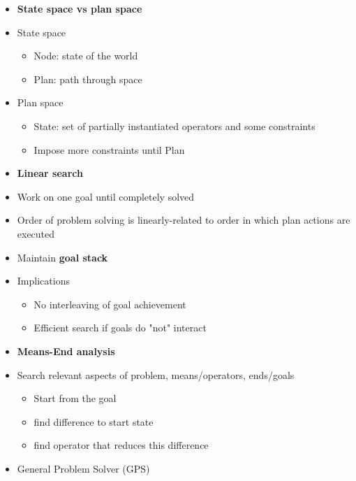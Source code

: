 \begin{itemize}
\item \textbf{State space vs plan space}
\item State space
	\begin{itemize}
	\item Node: state of the world
	\item Plan: path through space
	\end{itemize}
	
\item Plan space
	\begin{itemize}
	\item State: set of partially instantiated operators and some constraints
	\item Impose more constraints until Plan
	\end{itemize}

\item \textbf{Linear search}
\item Work on one goal until completely solved
\item Order of problem solving is linearly-related to order in which plan actions are executed
\item Maintain \textbf{goal stack}
\item Implications
	\begin{itemize}
	\item No interleaving of goal achievement
	\item Efficient search if goals do "not" interact
	\end{itemize}
	
\item \textbf{Means-End analysis}
\item Search relevant aspects of problem, means/operators, ends/goals
	\begin{itemize}
	\item Start from the goal
	\item find difference to start state
	\item find operator that reduces this difference
	\end{itemize}
\item General Problem Solver (GPS)
	

\end{itemize}
